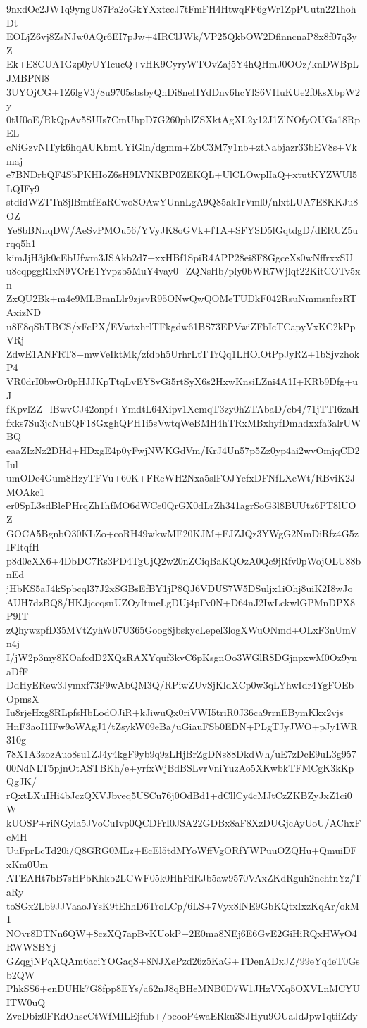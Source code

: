 9nxdOc2JW1q9yngU87Pa2oGkYXxtccJ7tFmFH4HtwqFF6gWr1ZpPUutn221hohDt
EOLjZ6vj8ZsNJw0AQr6EI7pJw+4IRClJWk/VP25QkbOW2DfinncnaP8x8f07q3yZ
Ek+E8CUA1Gzp0yUYIcucQ+vHK9CyryWTOvZaj5Y4hQHmJ0OOz/knDWBpLJMBPNl8
3UYOjCG+1Z6lgV3/8u9705sbsbyQnDi8neHYdDnv6hcYlS6VHuKUe2f0ksXbpW2y
0tU0oE/RkQpAv5SUIs7CmUhpD7G260phlZSXktAgXL2y12J1ZlNOfyOUGa18RpEL
cNiGzvNlTyk6hqAUKbmUYiGln/dgmm+ZbC3M7y1nb+ztNabjazr33bEV8s+Vkmaj
e7BNDrbQF4SbPKHIoZ6sH9LVNKBP0ZEKQL+UlCLOwplIaQ+xtutKYZWUl5LQIFy9
stdidWZTTn8jlBmtfEaRCwoSOAwYUnnLgA9Q85ak1rVml0/nlxtLUA7E8KKJu8OZ
Ye8bBNnqDW/AeSvPMOu56/YVyJK8oGVk+fTA+SFYSD5lGqtdgD/dERUZ5urqq5h1
kimJjH3jk0cEbUfwm3JSAkb2d7+xxHBf1SpiR4APP28ei8F8GgceXs0wNffrxxSU
u8cqpggRIxN9VCrE1Yvpzb5MuY4vay0+ZQNsHb/ply0bWR7Wjlqt22KitCOTv5xn
ZxQU2Bk+m4e9MLBmnLlr9zjsvR95ONwQwQOMeTUDkF042RsuNmmsnfczRTAxizND
u8E8qSbTBCS/xFcPX/EVwtxhrlTFkgdw61BS73EPVwiZFbIcTCapyVxKC2kPpVRj
ZdwE1ANFRT8+mwVeIktMk/zfdbh5UrhrLtTTrQq1LHOlOtPpJyRZ+1bSjvzhokP4
VR0drI0bwOr0pHJJKpTtqLvEY8vGi5rtSyX6s2HxwKnsiLZni4A1I+KRb9Dfg+uJ
fKpvlZZ+lBwvCJ42onpf+YmdtL64Xipv1XemqT3zy0hZTAbaD/cb4/71jTTI6zaH
fxks7Su3jcNuBQF18GxghQPH1i5sVwtqWeBMH4hTRxMBxhyfDmhdxxfa3alrUWBQ
eaaZIzNz2DHd+HDxgE4p0yFwjNWKGdVm/KrJ4Un57p5Zz0yp4ai2wvOmjqCD2Iul
umODe4Gum8HzyTFVu+60K+FReWH2Nxa5slFOJYefxDFNfLXeWt/RBviK2JMOAkc1
er0SpL3sdBlePHrqZh1hfMO6dWCe0QrGX0dLrZh341agrSoG3l8BUUtz6PT8lUOZ
GOCA5BgnbO30KLZo+coRH49wkwME20KJM+FJZJQz3YWgG2NmDiRfz4G5zIFItqfH
p8d0cXX6+4DbDC7Rs3PD4TgUjQ2w20nZCiqBaKQOzA0Qc9jRfv0pWojOLU88bnEd
jHbKS5aJ4kSpbcql37J2xSGBsEfBY1jP8QJ6VDUS7W5DSuljx1iOhj8uiK2I8wJo
AUH7dzBQ8/HKJjccqsnUZOyItmeLgDUj4pFv0N+D64nJ2IwLckwlGPMnDPX8P9IT
zQhywzpfD35MVtZyhW07U365Goog8jbskycLepel3logXWuONmd+OLxF3nUmVn4j
I/jW2p3my8KOafcdD2XQzRAXYquf3kvC6pKsgnOo3WGlR8DGjnpxwM0Oz9ynaDfF
DdHyERew3Jymxf73F9wAbQM3Q/RPiwZUvSjKldXCp0w3qLYhwIdr4YgFOEbOpmsX
Iu8rjeHxg8RLpfsHbLodOJiR+kJiwuQx0riVWI5triR0J36ca9rrnEBymKkx2vjs
HnF3aoI1IFw9oWAgJ1/tZsykW09eBa/uGiauFSb0EDN+PLgTJyJWO+pJy1WR310g
78X1A3zozAuo8su1ZJ4y4kgF9yb9q9zLHjBrZgDNs88DkdWh/uE7zDcE9uL3g957
00NdNLT5pjnOtASTBKh/e+yrfxWjBdBSLvrVniYuzAo5XKwbkTFMCgK3kKpQgJK/
rQxtLXuIHi4bJczQXVJbveq5USCu76j0OdBd1+dCllCy4cMJtCzZKBZyJxZ1ci0W
kUOSP+riNGyla5JVoCuIvp0QCDFrI0JSA22GDBx8aF8XzDUGjcAyUoU/AChxFcMH
UuFprLcTd20i/Q8GRG0MLz+EcEl5tdMYoWffVgORfYWPuuOZQHu+QmuiDFxKm0Um
ATEAHt7bB7sHPbKhkb2LCWF05k0HhFdRJb5aw9570VAxZKdRguh2nchtnYz/TaRy
toSGx2Lb9JJVaaoJYsK9tEhhD6TroLCp/6LS+7Vyx8lNE9GbKQtxIxzKqAr/okM1
NOvr8DTNn6QW+8czXQ7apBvKUokP+2E0ma8NEj6E6GvE2GiHiRQxHWyO4RWWSBYj
GZqgjNPqXQAm6aciYOGaqS+8NJXePzd26z5KaG+TDenADxJZ/99eYq4eT0Gsb2QW
PhkSS6+enDUHk7G8fpp8EYs/a62nJ8qBHeMNB0D7W1JHzVXq5OXVLnMCYUITW0uQ
ZvcDbiz0FRdOhscCtWfMILEjfub+/beooP4waERku3SJHyu9OUaJdJpw1qtiiZdy
